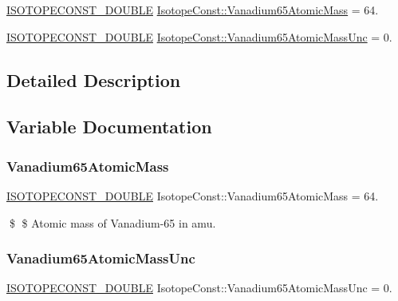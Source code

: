 \begin{DoxyCompactItemize}
\item 
\mbox{\hyperlink{group___isotope_const-_macros_ga8f45a7272ce02c0b4c65c44636ed719a}{I\+S\+O\+T\+O\+P\+E\+C\+O\+N\+S\+T\+\_\+\+D\+O\+U\+B\+LE}} \mbox{\hyperlink{group___isotope_const-_vanadium-_v65_ga0c78e80a1e89e378bdc5b3541b1babf2}{Isotope\+Const\+::\+Vanadium65\+Atomic\+Mass}} = 64.
\item 
\mbox{\hyperlink{group___isotope_const-_macros_ga8f45a7272ce02c0b4c65c44636ed719a}{I\+S\+O\+T\+O\+P\+E\+C\+O\+N\+S\+T\+\_\+\+D\+O\+U\+B\+LE}} \mbox{\hyperlink{group___isotope_const-_vanadium-_v65_gafcf26e7a7c77bef4542115df3478eaf4}{Isotope\+Const\+::\+Vanadium65\+Atomic\+Mass\+Unc}} = 0.
\end{DoxyCompactItemize}


\subsection{Detailed Description}


\subsection{Variable Documentation}
\mbox{\label{group___isotope_const-_vanadium-_v65_ga0c78e80a1e89e378bdc5b3541b1babf2}} 
\subsubsection{\texorpdfstring{Vanadium65\+Atomic\+Mass}{Vanadium65AtomicMass}}
{\footnotesize\ttfamily \mbox{\hyperlink{group___isotope_const-_macros_ga8f45a7272ce02c0b4c65c44636ed719a}{I\+S\+O\+T\+O\+P\+E\+C\+O\+N\+S\+T\+\_\+\+D\+O\+U\+B\+LE}} Isotope\+Const\+::\+Vanadium65\+Atomic\+Mass = 64.}

\$ \$ Atomic mass of Vanadium-\/65 in amu. \mbox{\label{group___isotope_const-_vanadium-_v65_gafcf26e7a7c77bef4542115df3478eaf4}} 
\subsubsection{\texorpdfstring{Vanadium65\+Atomic\+Mass\+Unc}{Vanadium65AtomicMassUnc}}
{\footnotesize\ttfamily \mbox{\hyperlink{group___isotope_const-_macros_ga8f45a7272ce02c0b4c65c44636ed719a}{I\+S\+O\+T\+O\+P\+E\+C\+O\+N\+S\+T\+\_\+\+D\+O\+U\+B\+LE}} Isotope\+Const\+::\+Vanadium65\+Atomic\+Mass\+Unc = 0.}

